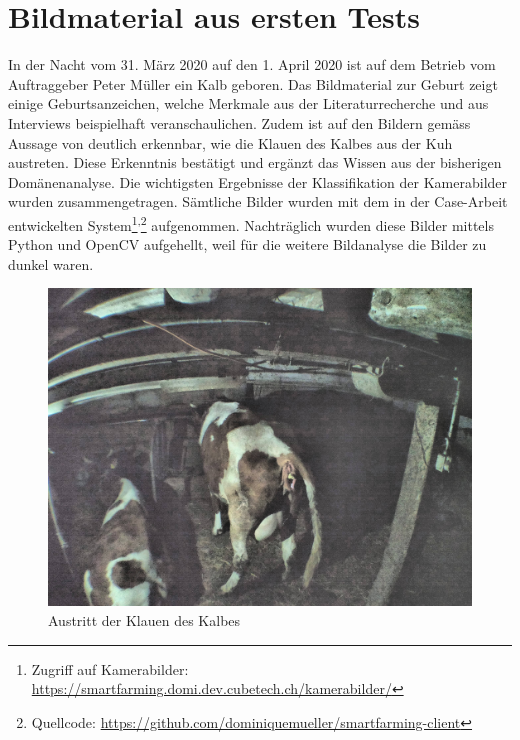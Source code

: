 
\section{Bildmaterial aus ersten Tests}

In der Nacht vom 31. März 2020 auf den 1. April 2020 ist auf dem Betrieb vom Auftraggeber Peter Müller ein Kalb geboren. Das Bildmaterial zur Geburt zeigt einige Geburtsanzeichen, welche Merkmale aus der Literaturrecherche und aus Interviews beispielhaft veranschaulichen. Zudem ist auf den Bildern gemäss Aussage von \citep{Muller2020a} deutlich erkennbar, wie die Klauen des Kalbes aus der Kuh austreten. Diese Erkenntnis bestätigt und ergänzt das Wissen aus der bisherigen Domänenanalyse. Die wichtigsten Ergebnisse der Klassifikation der Kamerabilder wurden zusammengetragen. Sämtliche Bilder wurden mit dem in der Case-Arbeit entwickelten System\footnote{Zugriff auf Kamerabilder: \url{https://smartfarming.domi.dev.cubetech.ch/kamerabilder/}}\textsuperscript{,}\footnote{Quellcode: \url{https://github.com/dominiquemueller/smartfarming-client}} aufgenommen. Nachträglich wurden diese Bilder mittels Python und OpenCV aufgehellt, weil für die weitere Bildanalyse die Bilder zu dunkel waren. \\





\begin{figure}[h]
	\center
	\includegraphics[scale=0.6]{Grafiken/austrittklauen.jpg}
	\caption{Austritt der Klauen des Kalbes \citep{Muller2020a}} 
	\label{fig: Austritt der Klauen des Kalbes}
\end{figure}


